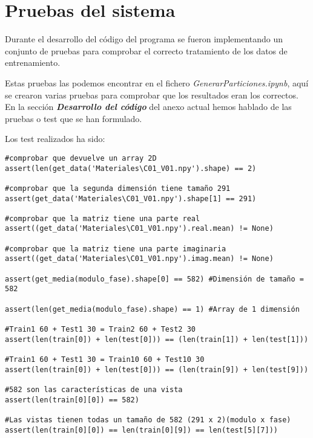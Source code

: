 \section{Pruebas del sistema}
Durante el desarrollo del código del programa se fueron implementando un conjunto de pruebas para comprobar el correcto tratamiento de los datos de entrenamiento.

Estas pruebas las podemos encontrar en el fichero \textit{GenerarParticiones.ipynb}, aquí se crearon varias pruebas para comprobar que los resultados eran los correctos. En la sección \textbf{\textit{Desarrollo del código}} del anexo actual hemos hablado de las pruebas o test que se han formulado.

Los test realizados ha sido:

\begin{verbatim}
#comprobar que devuelve un array 2D
assert(len(get_data('Materiales\C01_V01.npy').shape) == 2) 

#comprobar que la segunda dimensión tiene tamaño 291
assert(get_data('Materiales\C01_V01.npy').shape[1] == 291) 

#comprobar que la matriz tiene una parte real
assert((get_data('Materiales\C01_V01.npy').real.mean) != None) 

#comprobar que la matriz tiene una parte imaginaria
assert((get_data('Materiales\C01_V01.npy').imag.mean) != None) 

assert(get_media(modulo_fase).shape[0] == 582) #Dimensión de tamaño = 582

assert(len(get_media(modulo_fase).shape) == 1) #Array de 1 dimensión

#Train1 60 + Test1 30 = Train2 60 + Test2 30
assert(len(train[0]) + len(test[0])) == (len(train[1]) + len(test[1]))
 
#Train1 60 + Test1 30 = Train10 60 + Test10 30
assert(len(train[0]) + len(test[0])) == (len(train[9]) + len(test[9]))

#582 son las características de una vista
assert(len(train[0][0]) == 582)
 
#Las vistas tienen todas un tamaño de 582 (291 x 2)(modulo x fase)
assert(len(train[0][0]) == len(train[0][9]) == len(test[5][7])) 
\end{verbatim}